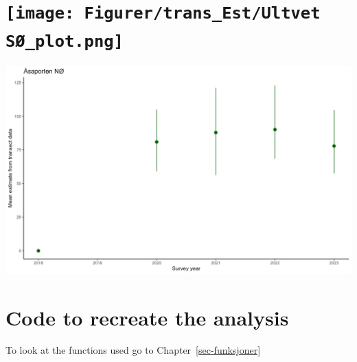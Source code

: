 \documentclass[
  letterpaper,
  DIV=11,
  numbers=noendperiod]{scrreport}
\begin{document}

\hypertarget{section-6}{%
\chapter{\texorpdfstring{\protect\texttt{[image: Figurer/trans\_Est/Ultvet SØ\_plot.png]}}{}}\label{section-6}}

\includegraphics{Figurer/trans_Est/Åsaporten NØ_plot.png}


\hypertarget{section-7}{%
\chapter{}\label{section-7}}


\hypertarget{sec-code}{%
\chapter{Code to recreate the analysis}\label{sec-code}}

To look at the functions used go to Chapter~\ref{sec-funksjoner}
\end{document}
